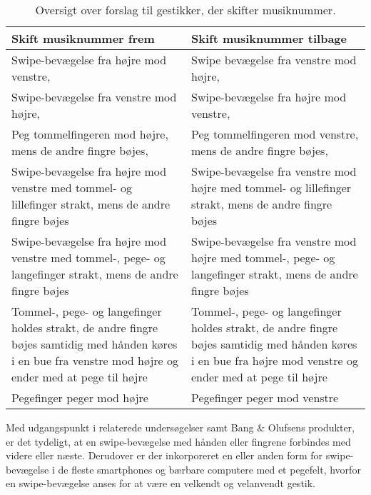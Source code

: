 \begin{table}[H]
	\centering
	\begin{tabular}{| p{6cm} | p{6cm} |}
		\hline
		\textbf{Skift musiknummer frem} & \textbf{Skift musiknummer tilbage} \\ \hline
		Swipe-bevægelse fra højre mod venstre, \parencite[s. 48]{WEB:Beosound2, WEB:BeosoundMoment, PDF:UserDefinedGesturesTV} & Swipe bevægelse fra venstre mod højre, \parencite[s. 48]{WEB:Beosound2, WEB:BeosoundMoment, PDF:UserDefinedGesturesTV} \\ \hline
		Swipe-bevægelse fra venstre mod højre, \parencite[s. 166]{PDF:ComparingInputModalities}  & Swipe-bevægelse fra højre mod venstre, \parencite[s. 166]{PDF:ComparingInputModalities}  \\ \hline
		Peg tommelfingeren mod højre, mens de andre fingre bøjes, \parencite[s. 166]{PDF:ComparingInputModalities} & Peg tommelfingeren mod venstre, mens de andre fingre bøjes, \parencite[s. 166]{PDF:ComparingInputModalities} \\ \hline
		Swipe-bevægelse fra højre mod venstre med tommel- og lillefinger strakt, mens de andre fingre bøjes & Swipe-bevægelse fra venstre mod højre med tommel- og lillefinger strakt, mens de andre fingre bøjes \\ \hline
		Swipe-bevægelse fra højre mod venstre med tommel-, pege- og langefinger strakt, mens de andre fingre bøjes & Swipe-bevægelse fra venstre mod højre med tommel-, pege- og langefinger strakt, mens de andre fingre bøjes \\ \hline
		Tommel-, pege- og langefinger holdes strakt, de andre fingre bøjes samtidig med hånden køres i en bue fra venstre mod højre og ender med at pege til højre & Tommel-, pege- og langefinger holdes strakt, de andre fingre bøjes samtidig med hånden køres i en bue fra højre mod venstre og ender med at pege til højre\\ \hline
		Pegefinger peger mod højre & Pegefinger peger mod venstre\\ \hline
	\end{tabular}
	\caption{Oversigt over forslag til gestikker, der skifter musiknummer.}
	\label{tab:IndsamledeGestikkerSkift}
\end{table}
\noindent
%
Med udgangspunkt i relaterede undersøgelser samt Bang $\&$ Olufsens produkter, er det tydeligt, at en swipe-bevægelse med hånden eller fingrene forbindes med videre eller næste. Derudover er der inkorporeret en eller anden form for swipe-bevægelse i de fleste smartphones og bærbare computere med et pegefelt, hvorfor en swipe-bevægelse anses for at være en velkendt og velanvendt gestik.

